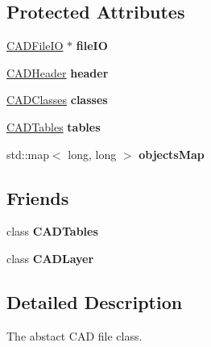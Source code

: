 \subsection*{Protected Attributes}
\begin{DoxyCompactItemize}
\item 
\hyperlink{class_c_a_d_file_i_o}{C\+A\+D\+File\+IO} $\ast$ {\bfseries file\+IO}\hypertarget{class_c_a_d_file_a520638860613882f28d871a2b3144e4d}{}\label{class_c_a_d_file_a520638860613882f28d871a2b3144e4d}

\item 
\hyperlink{class_c_a_d_header}{C\+A\+D\+Header} {\bfseries header}\hypertarget{class_c_a_d_file_ac4d7214d67374a266f763c87a9aed14c}{}\label{class_c_a_d_file_ac4d7214d67374a266f763c87a9aed14c}

\item 
\hyperlink{class_c_a_d_classes}{C\+A\+D\+Classes} {\bfseries classes}\hypertarget{class_c_a_d_file_a7b2a7683e84744800db66aba4892ec8e}{}\label{class_c_a_d_file_a7b2a7683e84744800db66aba4892ec8e}

\item 
\hyperlink{class_c_a_d_tables}{C\+A\+D\+Tables} {\bfseries tables}\hypertarget{class_c_a_d_file_afada89607a282b33061b63d9f67ac89c}{}\label{class_c_a_d_file_afada89607a282b33061b63d9f67ac89c}

\item 
std\+::map$<$ long, long $>$ {\bfseries objects\+Map}\hypertarget{class_c_a_d_file_a83d212922cd2e95466c0aad6ae3a746f}{}\label{class_c_a_d_file_a83d212922cd2e95466c0aad6ae3a746f}

\end{DoxyCompactItemize}
\subsection*{Friends}
\begin{DoxyCompactItemize}
\item 
class {\bfseries C\+A\+D\+Tables}\hypertarget{class_c_a_d_file_abbe0590d91a084db4f9d96a24868b3a0}{}\label{class_c_a_d_file_abbe0590d91a084db4f9d96a24868b3a0}

\item 
class {\bfseries C\+A\+D\+Layer}\hypertarget{class_c_a_d_file_aa43e75f3b7c4e30bf22233f08cc9f31b}{}\label{class_c_a_d_file_aa43e75f3b7c4e30bf22233f08cc9f31b}

\end{DoxyCompactItemize}


\subsection{Detailed Description}
The abstact C\+AD file class. 

